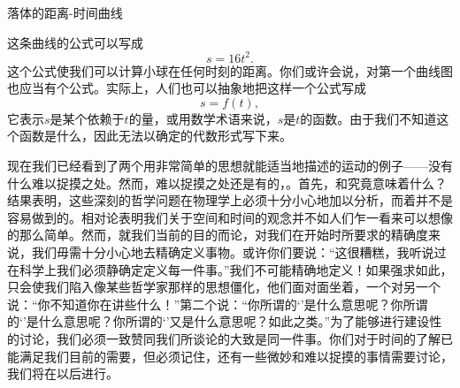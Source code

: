 \documentclass[12pt,oneside]{book}
\begin{document}
\begin{common-format}
\noindent
\begin{minipage}{\textwidth}
\begin{minipage}{0.3\textwidth}
\begin{table}[H]
\centering
\medskip 
{}
\caption*{表 8-2}
\end{table}

\end{minipage}\hfill
\begin{minipage}{0.7\textwidth}
\begin{linefig}[0.9]{落体的距离-时间曲线}
\caption{落体的距离-时间曲线}
\label{fig:落体的距离-时间曲线}
\end{linefig}
\end{minipage} 
\end{minipage} 


这条曲线的公式可以写成
\begin{equation}
\label{Eq:I:8:1}
s=16t^2.
\end{equation}
这个公式使我们可以计算小球在任何时刻的距离。你们或许会说，对第一个曲线图也应当有个公式。实际上，人们也可以抽象地把这样一个公式写成
\begin{equation}
\label{Eq:I:8:2}
s=f(t),
\end{equation}
它表示$s$是某个依赖于$t$的量，或用数学术语来说，$s$是$t$的函数。由于我们不知道这个函数是什么，因此无法以确定的代数形式写下来。

现在我们已经看到了两个用非常简单的思想就能适当地描述的运动的例子——没有什么难以捉摸之处。然而，难以捉摸之处还是有的，。首先，和究竟意味着什么？结果表明，这些深刻的哲学问题在物理学上必须十分小心地加以分析，而着并不是容易做到的。相对论表明我们关于空间和时间的观念并不如人们乍一看来可以想像的那么简单。然而，就我们当前的目的而论，对我们在开始时所要求的精确度来说，我们毋需十分小心地去精确定义事物。或许你们要说：“这很糟糕，我听说过在科学上我们必须静确定定义每一件事。”我们不可能精确地定义！如果强求如此，只会使我们陷入像某些哲学家那样的思想僵化，他们面对面坐着，一个对另一个说：“你不知道你在讲些什么！”第二个说：“你所谓的‘’是什么意思呢？你所谓的‘’是什么意思呢？你所谓的‘’又是什么意思呢？如此之类。”为了能够进行建设性的讨论，我们必须一致赞同我们所谈论的大致是同一件事。你们对于时间的了解已能满足我们目前的需要，但必须记住，还有一些微妙和难以捉摸的事情需要讨论，我们将在以后进行。


\end{common-format}
\end{document}
